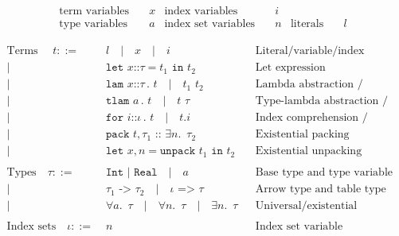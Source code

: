 \documentclass[12pt]{article}
\newcommand{\annot}[1]{\texttt{::} #1}
\newcommand{\quadbar}[0]{\quad | \quad}
\begin{document}
\begin{align*}
\text{term variables}&       \quad x &
\text{index variables}&      \quad i  \\
\text{type variables}&       \quad a &
\text{index set variables}&  \quad n &
\text{literals} & \quad l
\end{align*}

\vspace{-0.5cm}

\begin{align*}
\text{Terms } \quad t ::=
 & \quad l  \quadbar x \quadbar i
      && \text{Literal/variable/index variable} \\
|& \quad \texttt{let } x \annot{\tau} = t_1 \texttt{ in } t_2
        && \text{Let expression} \\
|& \quad \texttt{lam } x \annot{\tau} \, \texttt {.} \,\, t
   \quadbar  t_1 \,\, t_2
    && \text{Lambda abstraction / application} \\
|& \quad \texttt{tlam } a \, . \,\, t
   \quadbar t \,\, \tau
    && \text{Type-lambda abstraction / application} \\
|& \quad \texttt{for } i \annot{\iota} \, \texttt {.} \,\, t
   \quadbar t.i
    && \text{Index comprehension / indexing} \\
|& \quad \texttt{pack } t, \tau_1 \texttt{ :: } \exists n. \,\,\, \tau_2
       && \text{Existential packing} \\
|& \quad \texttt{let } x, n = \texttt{unpack } t_1 \texttt{ in } t_2
       && \text{Existential unpacking}
\\ \\
\text{Types} \quad \tau ::=
 & \quad \texttt{Int } | \texttt{ Real} \quadbar a  && \text{Base type and type variable} \\
|& \quad \tau_1 \texttt{ -> } \tau_2
   \quadbar \iota  \texttt{ => } \tau  && \text{Arrow type and table type} \\
|& \quad \forall a. \,\,\, \tau
   \quadbar \forall n. \,\,\, \tau
   \quadbar \exists n. \,\,\, \tau
    && \text{Universal/existential quantification}
\\ \\
\text{Index sets} \quad
\iota ::=
 & \quad n && \text{Index set variable}
\end{align*}
\end{document}
